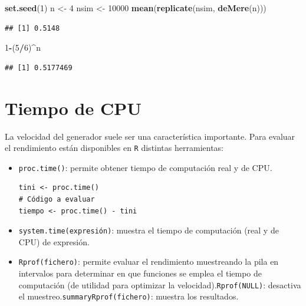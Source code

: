\documentclass[
]{book}
\newenvironment{Shaded}{\begin{snugshade}}{\end{snugshade}}
\newcommand{\DecValTok}[1]{\textcolor[rgb]{0.00,0.00,0.81}{#1}}
\newcommand{\KeywordTok}[1]{\textcolor[rgb]{0.13,0.29,0.53}{\textbf{#1}}}
\newcommand{\NormalTok}[1]{#1}
\newcommand{\OperatorTok}[1]{\textcolor[rgb]{0.81,0.36,0.00}{\textbf{#1}}}
\newcommand{\StringTok}[1]{\textcolor[rgb]{0.31,0.60,0.02}{#1}}
\theoremstyle{break}
\theoremstyle{definition}
\theoremstyle{definition}
\theoremstyle{definition}
\theoremstyle{remark}
\begin{document}
\begin{enumerate}
\begin{Shaded}
\begin{Highlighting}[]
\KeywordTok{set.seed}\NormalTok{(}\DecValTok{1}\NormalTok{)}
\NormalTok{n <-}\StringTok{ }\DecValTok{4}
\NormalTok{nsim <-}\StringTok{ }\DecValTok{10000}
\KeywordTok{mean}\NormalTok{(}\KeywordTok{replicate}\NormalTok{(nsim, }\KeywordTok{deMere}\NormalTok{(n)))}
\end{Highlighting}
\end{Shaded}

\begin{verbatim}
## [1] 0.5148
\end{verbatim}

\begin{Shaded}
\begin{Highlighting}[]
\DecValTok{1}\OperatorTok{-}\NormalTok{(}\DecValTok{5}\OperatorTok{/}\DecValTok{6}\NormalTok{)}\OperatorTok{^}\NormalTok{n}
\end{Highlighting}
\end{Shaded}

\begin{verbatim}
## [1] 0.5177469
\end{verbatim}
\end{enumerate}

\hypertarget{tiempo-de-cpu}{%
\section{Tiempo de CPU}\label{tiempo-de-cpu}}

La velocidad del generador suele ser una característica importante.
Para evaluar el rendimiento están disponibles en \texttt{R} distintas herramientas:

\begin{itemize}
\item
  \texttt{proc.time()}: permite obtener tiempo de computación real y de
  CPU.

\begin{verbatim}
tini <- proc.time()
# Código a evaluar
tiempo <- proc.time() - tini
\end{verbatim}
\item
  \texttt{system.time(expresión)}: muestra el tiempo de computación (real y
  de CPU) de expresión.
\item
  \texttt{Rprof(fichero)}: permite evaluar el rendimiento muestreando la pila
  en intervalos para determinar en que funciones se emplea el tiempo
  de computación (de utilidad para optimizar la
  velocidad).\texttt{Rprof(NULL)}: desactiva el
  muestreo.\texttt{summaryRprof(fichero)}: muestra los resultados.
\end{itemize}
\end{document}
